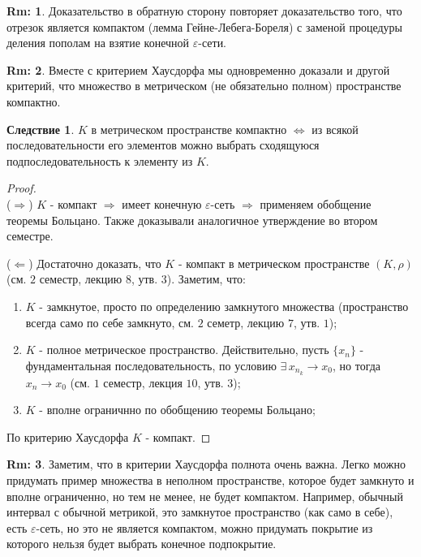 \documentclass[12pt]{article}
\newcommand{\VE}{\varepsilon}
\theoremstyle{definition}
\newtheorem{rem}{Rm:}
\newtheorem{corollary}{Следствие}
\begin{document}
\begin{rem}
	Доказательство в обратную сторону повторяет доказательство того, что отрезок является компактом (лемма Гейне-Лебега-Бореля) с заменой процедуры деления пополам на взятие конечной $\VE$-сети. 
\end{rem}
\begin{rem}
	Вместе с критерием Хаусдорфа мы одновременно доказали и другой критерий, что множество в метрическом (не обязательно полном) пространстве компактно.
\end{rem}
\begin{corollary}
	$K$ в метрическом пространстве компактно $\Leftrightarrow$ из всякой последовательности его элементов можно выбрать сходящуюся подпоследовательность к элементу из $K$.
\end{corollary}
\begin{proof}\hfill\\
	($\Rightarrow$) $K$ - компакт $\Rightarrow$ имеет конечную $\VE$-сеть $\Rightarrow$ применяем обобщение теоремы Больцано. Также доказывали аналогичное утверждение во втором семестре.
	
	($\Leftarrow$) Достаточно доказать, что $K$ - компакт в метрическом пространстве $(K, \rho)$ (см. $2$ семестр, лекцию $8$, утв. $3$). Заметим, что: 
	\begin{enumerate}[label={\arabic*)}]
		\item $K$ - замкнутое, просто по определению замкнутого множества (пространство всегда само по себе замкнуто, см. $2$ семетр, лекцию $7$, утв. $1$);
		\item $K$ - полное метрическое пространство. Действительно, пусть $\{x_n\}$ - фундаментальная последовательность, по условию $\exists \, x_{n_k} \to x_0$, но тогда $x_n \to x_0$ (см. $1$ семестр, лекция $10$, утв. $3$);
	 	\item $K$ - вполне ограничнно по обобщению теоремы Больцано;
	\end{enumerate}
	По критерию Хаусдорфа $K$ - компакт.
\end{proof}
\begin{rem}
	Заметим, что в критерии Хаусдорфа полнота очень важна. Легко можно придумать пример множества в неполном пространстве, которое будет замкнуто и вполне ограниченно, но тем не менее, не будет компактом. Например, обычный интервал с обычной метрикой, это замкнутое пространство (как само в себе), есть $\VE$-сеть, но это не является компактом, можно придумать покрытие из которого нельзя будет выбрать конечное подпокрытие.
\end{rem}
\newpage
\end{document}
